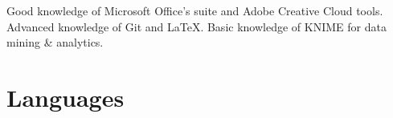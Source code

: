 \documentclass[10pt,a4paper,sans]{moderncv}        %
\begin{document}
 {Good knowledge of Microsoft Office's suite and Adobe Creative Cloud tools. Advanced knowledge of Git and \LaTeX. Basic knowledge of KNIME for data mining \& analytics.}

\section{Languages}

\nocite{*}
% 


\clearpage

\end{document}
